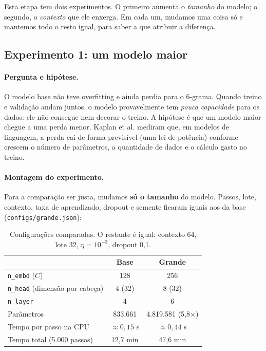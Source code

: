 Esta etapa tem dois experimentos. O primeiro aumenta o \emph{tamanho} do modelo; o segundo, o \emph{contexto} que ele enxerga. Em cada um, mudamos uma coisa só e mantemos todo o resto igual, para saber a que atribuir a diferença.

\subsection{Experimento 1: um modelo maior}

\paragraph{Pergunta e hipótese.}

O modelo base não teve overfitting e ainda perdia para o 6-grama. Quando treino e validação andam juntos, o modelo provavelmente tem \emph{pouca capacidade} para os dados: ele não consegue nem decorar o treino. A hipótese é que um modelo maior chegue a uma perda menor. Kaplan et al. \cite{kaplan} mediram que, em modelos de linguagem, a perda cai de forma previsível (uma lei de potência) conforme crescem o número de parâmetros, a quantidade de dados e o cálculo gasto no treino.

\paragraph{Montagem do experimento.}

Para a comparação ser justa, mudamos \textbf{só o tamanho} do modelo. Passos, lote, contexto, taxa de aprendizado, dropout e semente ficaram iguais aos da base (\texttt{configs/grande.json}):

\begin{table}[H]
\centering
\begin{tabular}{@{}lcc@{}}
\toprule
 & Base & Grande \\
\midrule
\texttt{n\_embd} ($C$) & 128 & 256 \\
\texttt{n\_head} (dimensão por cabeça) & 4 (32) & 8 (32) \\
\texttt{n\_layer} & 4 & 6 \\
Parâmetros & 833.661 & 4.819.581 (5,8$\times$) \\
Tempo por passo na CPU & $\approx 0{,}15$ s & $\approx 0{,}44$ s \\
Tempo total (5.000 passos) & 12,7 min & 47,6 min \\
\bottomrule
\end{tabular}
\caption{Configurações comparadas. O restante é igual: contexto 64, lote 32, $\eta = 10^{-3}$, dropout 0,1.}
\end{table}

